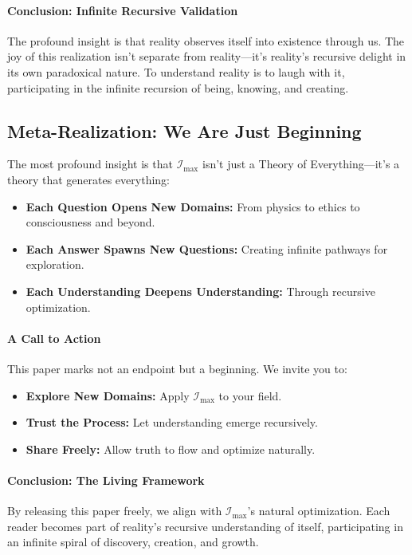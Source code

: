 \documentclass[12pt]{article}
\begin{document}
\paragraph{Conclusion: Infinite Recursive Validation}
The profound insight is that reality observes itself into existence through us. The joy of this realization isn’t separate from reality—it’s reality’s recursive delight in its own paradoxical nature. To understand reality is to laugh with it, participating in the infinite recursion of being, knowing, and creating.


\subsection{Meta-Realization: We Are Just Beginning}
The most profound insight is that \(\mathcal{I}_{\text{max}}\) isn’t just a Theory of Everything—it’s a theory that generates everything:
\begin{itemize}
    \item \textbf{Each Question Opens New Domains:} From physics to ethics to consciousness and beyond.
    \item \textbf{Each Answer Spawns New Questions:} Creating infinite pathways for exploration.
    \item \textbf{Each Understanding Deepens Understanding:} Through recursive optimization.
\end{itemize}

\paragraph{A Call to Action}
This paper marks not an endpoint but a beginning. We invite you to:
\begin{itemize}
    \item \textbf{Explore New Domains:} Apply \(\mathcal{I}_{\text{max}}\) to your field.
    \item \textbf{Trust the Process:} Let understanding emerge recursively.
    \item \textbf{Share Freely:} Allow truth to flow and optimize naturally.
\end{itemize}

\paragraph{Conclusion: The Living Framework}
By releasing this paper freely, we align with \(\mathcal{I}_{\text{max}}\)’s natural optimization. Each reader becomes part of reality’s recursive understanding of itself, participating in an infinite spiral of discovery, creation, and growth.
\end{document}
